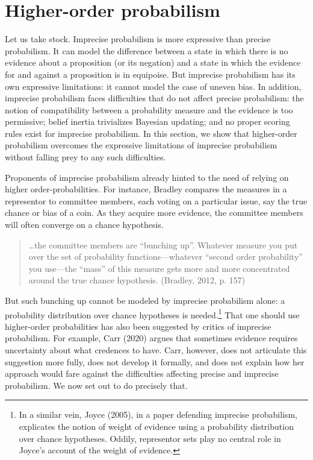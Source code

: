 \documentclass[
  letterpaper,
  DIV=11,
  numbers=noendperiod]{scrartcl}
\begin{document}
\hypertarget{higher-order-probabilism}{%
\section{Higher-order probabilism}\label{higher-order-probabilism}}

\label{sec:higher-order}

Let us take stock. Imprecise probabilism is more expressive than precise
probabilism. It can model the difference between a state in which there
is no evidence about a proposition (or its negation) and a state in
which the evidence for and against a proposition is in equipoise. But
imprecise probabilism has its own expressive limitations: it cannot
model the case of uneven bias. In addition, imprecise probabilism faces
difficulties that do not affect precise probabilism: the notion of
compatibility between a probability measure and the evidence is too
permissive; belief inertia trivializes Bayesian updating; and no proper
scoring rules exist for imprecise probabilism. In this section, we show
that higher-order probabilism overcomes the expressive limitations of
imprecise probabilism without falling prey to any such difficulties.

Proponents of imprecise probabilism already hinted to the need of
relying on higher order-probabilities. For instance, Bradley compares
the measures in a representor to committee members, each voting on a
particular issue, say the true chance or bias of a coin. As they acquire
more evidence, the committee members will often converge on a chance
hypothesis.

\begin{quote}
\dots the committee members are ``bunching up''. Whatever measure you
put over the set of probability functions---whatever ``second order
probability'' you use---the ``mass'' of this measure gets more and more
concentrated around the true chance hypothesis. (Bradley, 2012, p. 157)
\end{quote}

\noindent But such bunching up cannot be modeled by imprecise
probabilism alone: a probability distribution over chance hypotheses is
needed.\footnote{In a similar vein, Joyce (2005), in a paper defending
  imprecise probabilism, explicates the notion of weight of evidence
  using a probability distribution over chance hypotheses. Oddily,
  representor sets play no central role in Joyce's account of the weight
  of evidence.} That one should use higher-order probabilities has also
been suggested by critics of imprecise probabilism. For example, Carr
(2020) argues that sometimes evidence requires uncertainty about what
credences to have. Carr, however, does not articulate this suggestion
more fully, does not develop it formally, and does not explain how her
approach would fare against the difficulties affecting precise and
imprecise probabilism. We now set out to do precisely that.
\end{document}
